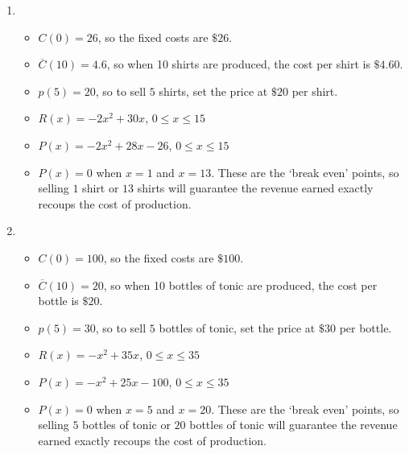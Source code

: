 \begin{enumerate}
\setcounter{enumi}{\value{HW}}

\item \begin{itemize}

\item  $C(0) = 26$, so the fixed costs are $\$26$.

\item  $\overline{C}(10) = 4.6$, so when 10 shirts are produced, the cost per shirt is $\$4.60$.

\item  $p(5) = 20$, so to sell $5$ shirts, set the price at $\$20$ per shirt.

\item $R(x) = -2x^2+30x$, $0 \leq x \leq 15$

\item  $P(x) = -2x^2+28x-26$, $0 \leq x \leq 15$

\item  $P(x) = 0$ when $x = 1$ and $x=13$.  These are the `break even' points, so selling $1$ shirt or $13$ shirts will guarantee the revenue earned exactly recoups the cost of production.

\end{itemize}


\item \begin{itemize}

\item  $C(0) = 100$, so the fixed costs are $\$100$.

\item  $\overline{C}(10) = 20$, so when 10 bottles of tonic are produced, the cost per bottle is $\$20$.

\item  $p(5) = 30$, so to sell $5$ bottles of tonic, set the price at $\$30$ per bottle.

\item $R(x) = -x^2+35x$, $0 \leq x \leq 35$

\item  $P(x) = -x^2+25x-100$, $0 \leq x \leq 35$

\item  $P(x) = 0$ when $x = 5$ and $x=20$.  These are the `break even' points, so selling $5$ bottles of tonic or $20$ bottles of tonic will guarantee the revenue earned exactly recoups the cost of production.

\end{itemize}



\end{enumerate}
